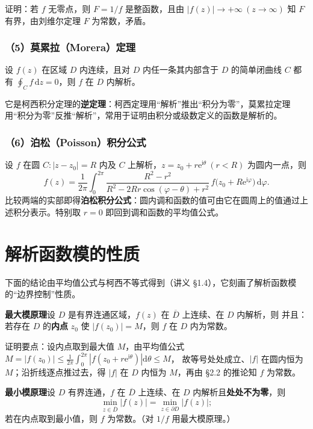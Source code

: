 证明：若 \(f\) 无零点，则 \(F=1/f\) 是整函数，且由 \(|f(z)|\to+\infty\ (z\to\infty)\) 知 \(F\) 有界，由刘维尔定理 \(F\) 为常数，矛盾。

\subsubsection*{（5）莫累拉（Morera）定理}
设 \(f(z)\) 在区域 \(D\) 内连续，且对 \(D\) 内任一条其内部含于 \(D\) 的简单闭曲线 \(C\) 都有 \(\oint_{C}f\,\mathrm{d}z=0\)，则 \(f\) 在 \(D\) 内解析。

它是柯西积分定理的\textbf{逆定理}：柯西定理用“解析”推出“积分为零”，莫累拉定理用“积分为零”反推“解析”，常用于证明由积分或级数定义的函数是解析的。

\subsubsection*{（6）泊松（Poisson）积分公式}
设 \(f\) 在圆 \(C:|z-z_{0}|=R\) 内及 \(C\) 上解析，\(z=z_{0}+r\mathrm{e}^{\mathrm{i}\theta}\ (r<R)\) 为圆内一点，则
\[
f(z)=\frac{1}{2\pi}\int_{0}^{2\pi}
\frac{R^{2}-r^{2}}{R^{2}-2Rr\cos(\varphi-\theta)+r^{2}}\,
f\bigl(z_{0}+R\mathrm{e}^{\mathrm{i}\varphi}\bigr)\,\mathrm{d}\varphi .
\]
比较两端的实部即得\textbf{泊松积分公式}：圆内调和函数的值可由它在圆周上的值通过上述积分表示。特别取 \(r=0\) 即回到调和函数的平均值公式。

\section{解析函数模的性质}

下面的结论由平均值公式与柯西不等式得到（讲义 §1.4），它刻画了解析函数模的“边界控制”性质。

\textbf{最大模原理}\quad 设 \(D\) 是有界连通区域，\(f(z)\) 在 \(\overline{D}\) 上连续、在 \(D\) 内解析，则
并且：若存在 \(D\) 的\textbf{内点} \(z_{0}\) 使 \(|f(z_{0})|=M\)，则 \(f\) 在 \(D\) 内为常数。

证明要点：设内点取到最大值 \(M\)，由平均值公式
\(M=|f(z_{0})|\leqslant\frac{1}{2\pi}\int_{0}^{2\pi}|f(z_{0}+r\mathrm{e}^{\mathrm{i}\theta})|\mathrm{d}\theta\leqslant M\)，
故等号处处成立、\(|f|\) 在圆内恒为 \(M\)；沿折线逐点推过去，得 \(|f|\) 在 \(D\) 内恒为 \(M\)，再由 §2.2 的推论知 \(f\) 为常数。

\textbf{最小模原理}\quad 设 \(D\) 有界连通，\(f\) 在 \(\overline{D}\) 上连续、在 \(D\) 内解析且\textbf{处处不为零}，则
\[
\min_{z\in\overline{D}}|f(z)|=\min_{z\in\partial D}|f(z)|;
\]
若在内点取到最小值，则 \(f\) 为常数。（对 \(1/f\) 用最大模原理。）

